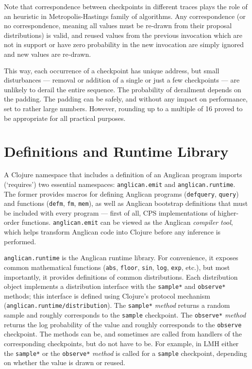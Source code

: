 \documentclass[preprint]{sigplanconf}
\begin{document}
Note that correspondence between checkpoints in different
traces plays the role of an heuristic in Metropolis-Hastings
family of algorithms. Any correspondence (or no correspondence,
meaning all values must be re-drawn from their proposal
distributions) is valid, and reused values from the previous
invocation which are not in support or have zero probability in
the new invocation are simply ignored and new values are
re-drawn.

This way, each occurrence of a checkpoint has unique address,
but small disturbances --- removal or addition of a single or just
a few checkpoints --- are unlikely to derail the entire sequence.
The probability of derailment depends on the padding. The
padding can be safely, and without any impact on performance,
set to rather large numbers. However, rounding up to a multiple
of 16 proved to be appropriate for all practical purposes.
\iftoggle{full}{%

Function \texttt{checkpoint-id} in the
\texttt{anglican.inference} namespace automates generation of
checkpoint addresses and can be used from any inference
algorithm.
}{%
}%

\section{Definitions and Runtime Library}
\label{seq:runtime}

A Clojure namespace that includes a definition of an Anglican
program imports (`requires') two essential namespaces:
\texttt{anglican.emit} and \texttt{anglican.runtime}. The former
provides macros for defining Anglican programs
(\texttt{defquery}, \texttt{query}) and functions
(\texttt{defm}, \texttt{fm}, \texttt{mem}), as well as Anglican
bootstrap definitions that must be included with every program
--- first of all, CPS implementations of higher-order functions.
\texttt{anglican.emit} can be viewed as the Anglican
\textit{compiler tool}, which helps transform Anglican code into
Clojure before any inference is performed.

\texttt{anglican.runtime} is the Anglican runtime library. For
convenience, it exposes common mathematical functions
(\texttt{abs}, \texttt{floor}, \texttt{sin}, \texttt{log},
\texttt{exp}, etc.), but most importantly, it provides
definitions of common distributions. Each distribution object implements a
distribution interface with the \texttt{sample*} and \texttt{observe*} methods;
this interface is defined using Clojure's protocol mechanism
(\texttt{anglican.{\linebreak[0]}runtime/{\linebreak[0]}distribution}).
The \texttt{sample*} \textit{method} returns a random sample and
roughly corresponds to the \texttt{sample} checkpoint.
The \texttt{observe*} \textit{method} returns the log probability
of the value and roughly corresponds to the \texttt{observe}
checkpoint. The methods can be, and sometimes are called from
handlers of the corresponding checkpoints, but do not have to
be. For example, in LMH either the \texttt{sample*} or
the \texttt{observe*} \textit{method} is called for a
\texttt{sample} checkpoint, depending on whether the value is
drawn or reused.
\end{document}
